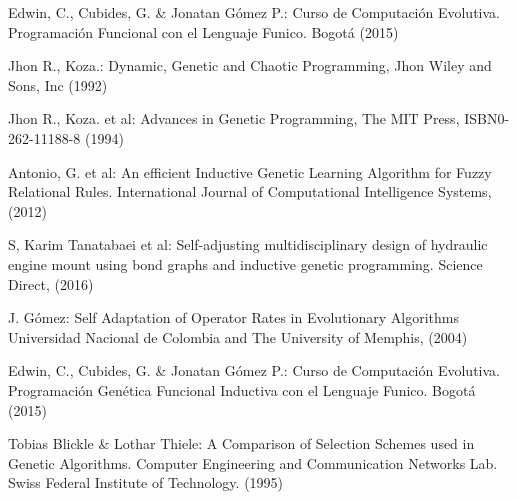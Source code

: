 \documentclass{llncs}
\begin{document}
\begin{thebibliography}{8}
%
Edwin, C., Cubides, G. \& Jonatan Gómez P.:
Curso de Computación Evolutiva. Programación Funcional con el Lenguaje Funico.
Bogotá (2015)

Jhon R., Koza.:
Dynamic, Genetic and Chaotic Programming,
Jhon Wiley and Sons, Inc (1992)

Jhon R., Koza. et al:
Advances in Genetic Programming, 
The MIT Press, ISBN0-262-11188-8 (1994)

Antonio, G. et al:
An efficient Inductive Genetic Learning Algorithm for Fuzzy Relational Rules.
International Journal of Computational Intelligence Systems, (2012)

S, Karim Tanatabaei et al:
Self-adjusting multidisciplinary design of hydraulic engine mount using bond graphs and inductive genetic programming.
Science Direct, (2016)

J. Gómez:
Self Adaptation of Operator Rates in Evolutionary Algorithms
Universidad Nacional de Colombia and The University of Memphis, (2004)

Edwin, C., Cubides, G. \& Jonatan Gómez P.:
Curso de Computación Evolutiva. Programación Genética Funcional Inductiva con el Lenguaje Funico.
Bogotá (2015)

Tobias Blickle \& Lothar Thiele:
A Comparison of Selection Schemes used in Genetic Algorithms.
Computer Engineering and Communication Networks Lab.
Swiss Federal Institute of Technology. (1995)

\end{thebibliography}
\end{document}
